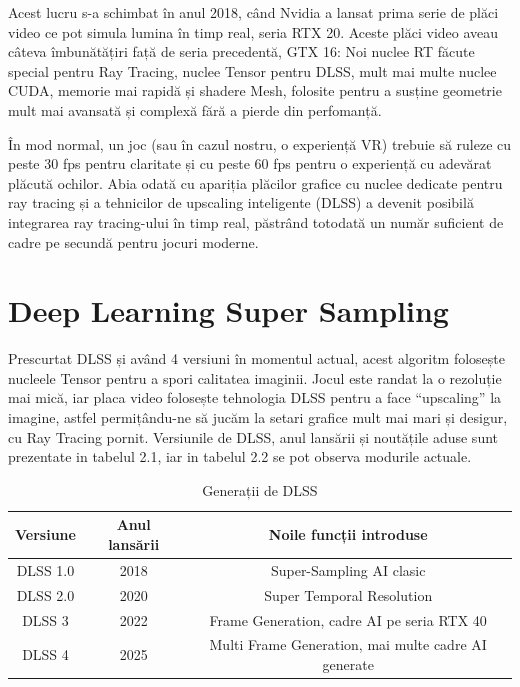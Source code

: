 Acest lucru s-a schimbat în anul 2018, când Nvidia a lansat prima serie de plăci video ce pot simula lumina în timp real, seria RTX 20. Aceste plăci video aveau câteva îmbunătățiri față de seria precedentă, GTX 16: Noi nuclee RT făcute special pentru Ray Tracing, nuclee Tensor pentru DLSS, mult mai multe nuclee CUDA, memorie mai rapidă și shadere Mesh, folosite pentru a susține geometrie mult mai avansată și complexă fără a pierde din perfomanță.

În mod normal, un joc (sau în cazul nostru, o experiență VR) trebuie să ruleze cu peste 30 fps pentru claritate și cu peste 60 fps pentru o experiență cu adevărat plăcută ochilor. Abia odată cu apariția plăcilor grafice cu nuclee dedicate pentru ray tracing și a tehnicilor de upscaling inteligente (DLSS) a devenit posibilă integrarea ray tracing-ului în timp real, păstrând totodată un număr suficient de cadre pe secundă pentru jocuri moderne.

\section{\textbf{D}eep \textbf{L}earning \textbf{S}uper \textbf{S}ampling}

Prescurtat DLSS\cite{nvidia:dlss} și având 4 versiuni în momentul actual, acest algoritm folosește nucleele Tensor pentru a spori calitatea imaginii. Jocul este randat la o rezoluție mai mică, iar placa video folosește tehnologia DLSS pentru a face “upscaling” la imagine, astfel permițându-ne să jucăm la setari grafice mult mai mari și desigur, cu Ray Tracing pornit. Versiunile de DLSS, anul lansării și noutățile aduse sunt prezentate in tabelul 2.1, iar in tabelul 2.2 se pot observa modurile actuale.

\begin{table}[h]
  \centering
  \begin{tabular}{||c c c||}
    \hline
    Versiune & Anul lansării & Noile funcții introduse \\[0.5ex]
    \hline\hline
    DLSS 1.0 & 2018 & Super-Sampling AI clasic \\
    \hline
    DLSS 2.0 & 2020 & Super Temporal Resolution \\
    \hline
    DLSS 3   & 2022 & Frame Generation, cadre AI pe seria RTX 40 \\
    \hline
    DLSS 4   & 2025 & Multi Frame Generation, mai multe cadre AI generate \\[1ex]
    \hline
  \end{tabular}
    \caption{Generații de DLSS}
  \label{tab:dlss-generations}
\end{table}


